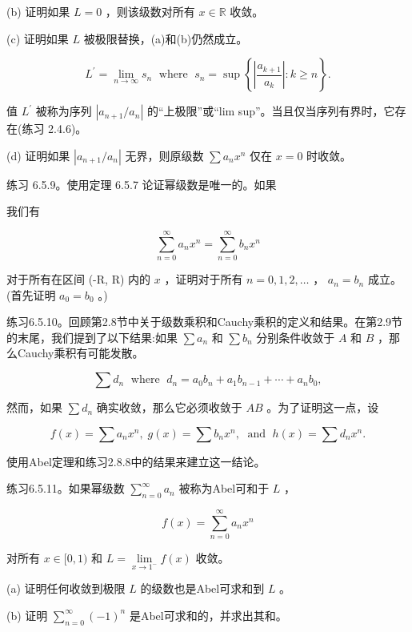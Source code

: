 (b) 证明如果 \(L = 0\) ，则该级数对所有 \(x \in  \mathbb{R}\) 收敛。

(c) 证明如果 \(L\) 被极限替换，(a)和(b)仍然成立。

\[
{L}^{\prime } = \mathop{\lim }\limits_{{n \rightarrow  \infty }}{s}_{n}\;\text{ where }\;{s}_{n} = \sup \left\{  {\left| \frac{{a}_{k + 1}}{{a}_{k}}\right|  : k \geq  n}\right\}  .
\]

值 \({L}^{\prime }\) 被称为序列 \(\left| {{a}_{n + 1}/{a}_{n}}\right|\) 的“上极限”或“lim sup”。当且仅当序列有界时，它存在(练习 2.4.6)。

(d) 证明如果 \(\left| {{a}_{n + 1}/{a}_{n}}\right|\) 无界，则原级数 \(\sum {a}_{n}{x}^{n}\) 仅在 \(x = 0\) 时收敛。

练习 6.5.9。使用定理 6.5.7 论证幂级数是唯一的。如果

我们有

\[
\mathop{\sum }\limits_{{n = 0}}^{\infty }{a}_{n}{x}^{n} = \mathop{\sum }\limits_{{n = 0}}^{\infty }{b}_{n}{x}^{n}
\]

对于所有在区间 (-R, R) 内的 \(x\) ，证明对于所有 \(n = 0,1,2,\ldots\) ， \({a}_{n} = {b}_{n}\) 成立。(首先证明 \({a}_{0} = {b}_{0}\) 。)

练习6.5.10。回顾第2.8节中关于级数乘积和Cauchy乘积的定义和结果。在第2.9节的末尾，我们提到了以下结果:如果 \(\sum {a}_{n}\) 和 \(\sum {b}_{n}\) 分别条件收敛于 \(A\) 和 \(B\) ，那么Cauchy乘积有可能发散。

\[
\sum {d}_{n}\;\text{ where }\;{d}_{n} = {a}_{0}{b}_{n} + {a}_{1}{b}_{n - 1} + \cdots  + {a}_{n}{b}_{0},
\]

然而，如果 \(\sum {d}_{n}\) 确实收敛，那么它必须收敛于 \({AB}\) 。为了证明这一点，设

\[
f\left( x\right)  = \sum {a}_{n}{x}^{n},\;g\left( x\right)  = \sum {b}_{n}{x}^{n},\;\text{ and }\;h\left( x\right)  = \sum {d}_{n}{x}^{n}.
\]

使用Abel定理和练习2.8.8中的结果来建立这一结论。

练习6.5.11。如果幂级数 \(\mathop{\sum }\limits_{{n = 0}}^{\infty }{a}_{n}\) 被称为Abel可和于 \(L\) ，

\[
f\left( x\right)  = \mathop{\sum }\limits_{{n = 0}}^{\infty }{a}_{n}{x}^{n}
\]

对所有 \(x \in  \lbrack 0,1)\) 和 \(L = \mathop{\lim }\limits_{{x \rightarrow  {1}^{ - }}}f\left( x\right)\) 收敛。

(a) 证明任何收敛到极限 \(L\) 的级数也是Abel可求和到 \(L\) 。

(b) 证明 \(\mathop{\sum }\limits_{{n = 0}}^{\infty }{\left( -1\right) }^{n}\) 是Abel可求和的，并求出其和。

